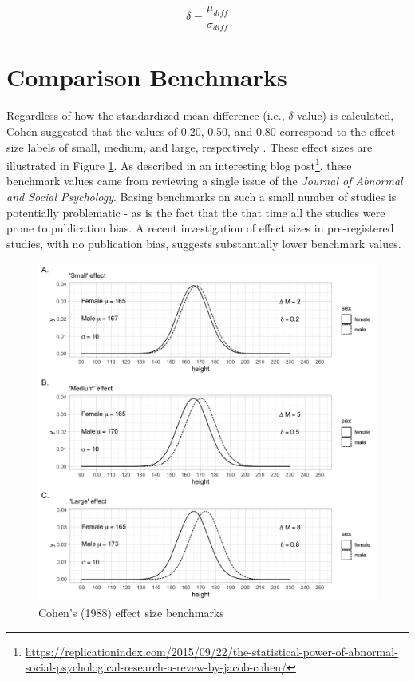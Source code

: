 \documentclass[
]{krantz}
\renewcommand{\href}[2]{#2\footnote{\url{#1}}}
\begin{document}
\begin{equation} 
\delta =  \frac{\mu_{diff}}{\sigma_{diff}}
      \label{eq:popsmddiffch4}
\end{equation}

\hypertarget{comparison-benchmarks}{%
\section{Comparison Benchmarks}\label{comparison-benchmarks}}

Regardless of how the standardized mean difference (i.e., \(\delta\)-value) is calculated, Cohen suggested that the values of 0.20, 0.50, and 0.80 correspond to the effect size labels of small, medium, and large, respectively \citep{cohen1988}. These effect sizes are illustrated in Figure \ref{fig:dex4}. As described in an interesting \href{https://replicationindex.com/2015/09/22/the-statistical-power-of-abnormal-social-psychological-research-a-revew-by-jacob-cohen/}{blog post}, these benchmark values came from reviewing a single issue of the \emph{Journal of Abnormal and Social Psychology}. Basing benchmarks on such a small number of studies is potentially problematic - as is the fact that the that time all the studies were prone to publication bias. A recent investigation \citep[see][]{schafer2019meaningfulness} of effect sizes in pre-registered studies, with no publication bias, suggests substantially lower benchmark values.

\begin{figure}
\includegraphics[width=1\linewidth]{ch_populations/images/dvalue_ex4} \caption{Cohen's (1988) effect size benchmarks}\label{fig:dex4}
\end{figure}
\end{document}
